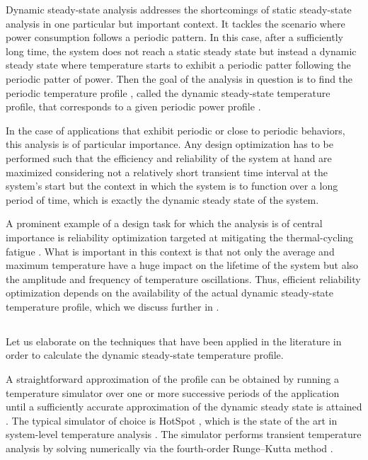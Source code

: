 Dynamic steady-state analysis addresses the shortcomings of static steady-state
analysis in one particular but important context. It tackles the scenario where
power consumption follows a periodic pattern. In this case, after a sufficiently
long time, the system does not reach a static steady state but instead a dynamic
steady state where temperature starts to exhibit a periodic patter following the
periodic patter of power. Then the goal of the analysis in question is to find
the periodic temperature profile \mq, called the dynamic steady-state
temperature profile, that corresponds to a given periodic power profile \mp.

In the case of applications that exhibit periodic or close to periodic
behaviors, this analysis is of particular importance. Any design optimization
has to be performed such that the efficiency and reliability of the system at
hand are maximized considering not a relatively short transient time interval at
the system's start but the context in which the system is to function over a
long period of time, which is exactly the dynamic steady state of the system.

A prominent example of a design task for which the analysis is of central
importance is reliability optimization targeted at mitigating the
thermal-cycling fatigue \cite{jedec2016}. What is important in this context is
that not only the average and maximum temperature have a huge impact on the
lifetime of the system but also the amplitude and frequency of temperature
oscillations. Thus, efficient reliability optimization depends on the
availability of the actual dynamic steady-state temperature profile, which we
discuss further in .

\subsection{\priortitle}

Let us elaborate on the techniques that have been applied in the literature in
order to calculate the dynamic steady-state temperature profile.

A straightforward approximation of the profile can be obtained by running a
temperature simulator over one or more successive periods of the application
until a sufficiently accurate approximation of the dynamic steady state is
attained \cite{srinivasan2004}. The typical simulator of choice is HotSpot
\cite{skadron2003}, which is the state of the art in system-level temperature
analysis \cite{srinivasan2004, liao2005, coskun2006, liu2007, huang2009b,
xiang2010, thiele2011}. The simulator performs transient temperature analysis by
solving  numerically via the fourth-order
Runge--Kutta method \cite{press2007}.


